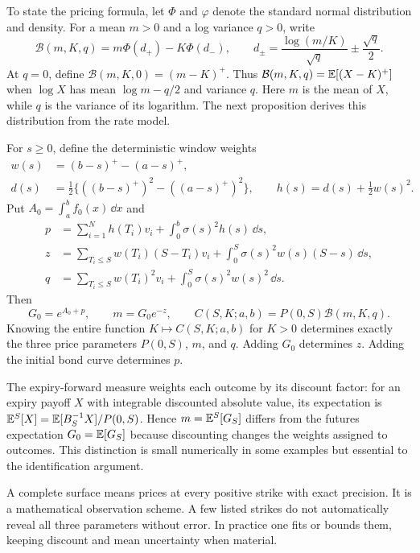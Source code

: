 To state the pricing formula, let $\Phi$ and $\varphi$ denote the standard normal distribution and density. For a mean $m>0$ and a log variance $q>0$, write
\begin{equation}\label{eq:black}
\mathcal B(m,K,q)=m\Phi(d_+)-K\Phi(d_-),\qquad
 d_\pm=\frac{\log(m/K)}{\sqrt q}\pm\frac{\sqrt q}{2}.
\end{equation}
At $q=0$, define $\mathcal B(m,K,0)=(m-K)^+$. Thus $\mathcal B(m,K,q)=\mathbb E[(X-K)^+]$ when $\log X$ has mean $\log m-q/2$ and variance $q$. Here $m$ is the mean of $X$, while $q$ is the variance of its logarithm. The next proposition derives this distribution from the rate model.

\begin{proposition}\label{prop:pricing}
For $s\geq0$, define the deterministic window weights
\begin{align}
w(s)&=(b-s)^+-(a-s)^+,\nonumber\\
d(s)&=\tfrac12\{((b-s)^+)^2-((a-s)^+)^2\},\qquad
h(s)=d(s)+\tfrac12 w(s)^2.\label{eq:weights}
\end{align}
Put $A_0=\int_a^b f_0(x)\,\dd x$ and
\begin{align}
p&=\sum_{i=1}^N h(T_i)v_i+\int_0^b\sigma(s)^2h(s)\,\dd s,\label{eq:p}\\
z&=\sum_{T_i\leq S}w(T_i)(S-T_i)v_i
       +\int_0^S\sigma(s)^2w(s)(S-s)\,\dd s,\label{eq:z}\\
q&=\sum_{T_i\leq S}w(T_i)^2v_i
       +\int_0^S\sigma(s)^2w(s)^2\,\dd s.\label{eq:q}
\end{align}
Then
\begin{equation}\label{eq:price}
G_0=e^{A_0+p},\qquad m=G_0e^{-z},\qquad
C(S,K;a,b)=P(0,S)\mathcal B(m,K,q).
\end{equation}
Knowing the entire function $K\mapsto C(S,K;a,b)$ for $K>0$ determines exactly the three price parameters $P(0,S)$, $m$, and $q$. Adding $G_0$ determines $z$. Adding the initial bond curve determines $p$.
\end{proposition}
The expiry-forward measure weights each outcome by its discount factor: for an expiry payoff $X$ with integrable discounted absolute value, its expectation is $\mathbb E^{S}[X]=\mathbb E[B_S^{-1}X]/P(0,S)$. Hence $m=\mathbb E^{S}[G_S]$ differs from the futures expectation $G_0=\mathbb E[G_S]$ because discounting changes the weights assigned to outcomes. This distinction is small numerically in some examples but essential to the identification argument.

A complete surface means prices at every positive strike with exact precision. It is a mathematical observation scheme. A few listed strikes do not automatically reveal all three parameters without error. In practice one fits or bounds them, keeping discount and mean uncertainty when material.

